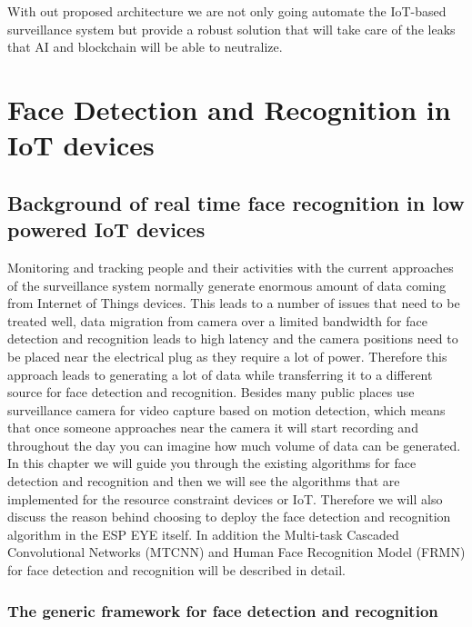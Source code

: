 With out proposed architecture we are not only going automate the IoT-based surveillance system but provide a robust solution that will take care of the leaks that AI and blockchain will be able to neutralize. 


\chapter{Face Detection and Recognition in IoT devices}
\label{chap:face_detection}
\section{Background of real time face recognition in low powered IoT devices}
Monitoring and tracking people and their activities with the current approaches of the surveillance system normally generate enormous amount of data coming from Internet of Things devices. This leads to a number of issues that need to be treated well, data migration from camera over a limited bandwidth for face detection and recognition leads to high latency  and the camera positions need to be placed near the electrical plug as they require a lot of power. Therefore this approach leads to generating a lot of data while transferring it to a different source for face detection and recognition. Besides many public places use surveillance camera for video capture based on motion detection, which means that once someone approaches near the camera it will start recording and throughout the day you can imagine how much volume of data can be generated. 
In this chapter we will guide you through the existing algorithms for face detection and recognition and then we will see the algorithms that are implemented for the resource constraint devices or IoT. Therefore we will also discuss the reason behind choosing to deploy the face detection and recognition algorithm in the ESP EYE itself. In addition the Multi-task Cascaded Convolutional Networks (MTCNN) and  Human Face Recognition Model (FRMN) for face detection and recognition will be described in detail. 


\subsection{The generic framework for face detection and recognition}


